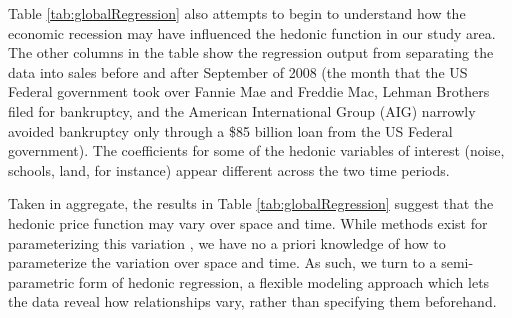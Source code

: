 \documentclass{article}\usepackage{graphicx, color}
\begin{document}
Table \ref{tab:globalRegression} also attempts to begin to understand how the economic recession may have influenced the hedonic function in our study area. The other columns in the table show the regression output from separating the data into sales before and after September of 2008 (the month that the US Federal government took over Fannie Mae and Freddie Mac, Lehman Brothers filed for bankruptcy, and the American International Group (AIG) narrowly avoided bankruptcy only through a \$85 billion loan from the US Federal government). The coefficients for some of the hedonic variables of interest (noise, schools, land, for instance) appear different across the two time periods.

Taken in aggregate, the results in Table \ref{tab:globalRegression} suggest that the hedonic price function may vary over space and time. While methods exist for parameterizing this variation \citep[such as spatial expansion as suggested by][]{Casetti1972}, we have no a priori knowledge of how to parameterize the variation over space and time. As such, we turn to a semi-parametric form of hedonic regression, a flexible modeling approach which lets the data reveal how relationships vary, rather than specifying them beforehand.
\end{document}
